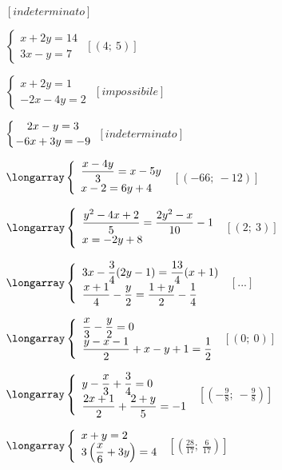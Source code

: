 \begin{esercizio}[\Ast]
\begin{multicols}{2}
\begin{enumeratea}
 \hfill $\left[indeterminato\right]$
\item $\left\{\begin{array}{l}x+2y=14\\3x-y=7\end{array}\right.$
 \hfill $\left[(4;~5)\right]$
\item $\left\{\begin{array}{l}x+2y=1\\-2x-4y=2\end{array}\right.$
 \hfill $\left[impossibile\right]$
\item $\left\{\genfrac{}{}{0pt}{0}{2x-y=3}{-6x+3y=-9}\right.$
 \hfill $\left[indeterminato\right]$
 \item $\longarray\left\{\begin{array}{l}
\dfrac{x-4y}{3}=x-5y\\
x-2=6y+4 \end{array}\right.$
 \hfill $\left[(-66;~-12)\right]$
\item $\longarray\left\{\begin{array}{l}
\dfrac{y^{2}-4x+2}{5}=\dfrac{2y^{2}-x}{10}-1\\
x=-2y+8\end{array}\right.$
 \hfill $\left[(2;~3)\right]$
\item $\longarray\left\{\begin{array}{l}
3x-\dfrac{3}{4}(2y-1)=\dfrac{13}{4}(x+1)\\
\dfrac{x+1}{4}-\dfrac{y}{2}=\dfrac{1+y}{2}-\dfrac{1}{4}\end{array}\right.$
 \hfill $\left[...\right]$
\item $\longarray\left\{\begin{array}{l}
\dfrac{x}{3}-\dfrac{y}{2}=0\\
\dfrac{y-x-1}{2}+x-y+1=\dfrac{1}{2}\end{array}\right.$
 \hfill $\left[(0;~0)\right]$
\item $\longarray\left\{\begin{array}{l}
y-\dfrac{x}{3}+\dfrac{3}{4}=0\\
\dfrac{2x+1}{2}+\dfrac{2+y}{5}=-1
\end{array}\right.$
 \hfill $\left[\left(-{\frac{9}{8}};~-\frac{9}{8}\right)\right]$
\item $\longarray\left\{\begin{array}{l}
x+y=2\\
3\left(\dfrac{x}{6}+3y\right)=4\end{array}\right.$
 \hfill $\left[\left(\frac{28}{17};~\frac{6}{17}\right)\right]$

\end{enumeratea}
\end{multicols}
\end{esercizio}
